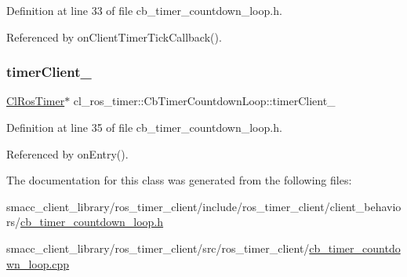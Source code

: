 Definition at line 33 of file cb\+\_\+timer\+\_\+countdown\+\_\+loop.\+h.



Referenced by on\+Client\+Timer\+Tick\+Callback().

\mbox{\label{classcl__ros__timer_1_1CbTimerCountdownLoop_acca81b8f1807f8e8faf692fb3f9e4dbd}} 
\subsubsection{\texorpdfstring{timer\+Client\+\_\+}{timerClient\_}}
{\footnotesize\ttfamily \hyperlink{classcl__ros__timer_1_1ClRosTimer}{Cl\+Ros\+Timer}$\ast$ cl\+\_\+ros\+\_\+timer\+::\+Cb\+Timer\+Countdown\+Loop\+::timer\+Client\+\_\+\hspace{0.3cm}{\ttfamily [private]}}



Definition at line 35 of file cb\+\_\+timer\+\_\+countdown\+\_\+loop.\+h.



Referenced by on\+Entry().



The documentation for this class was generated from the following files\+:\begin{DoxyCompactItemize}
\item 
smacc\+\_\+client\+\_\+library/ros\+\_\+timer\+\_\+client/include/ros\+\_\+timer\+\_\+client/client\+\_\+behaviors/\hyperlink{cb__timer__countdown__loop_8h}{cb\+\_\+timer\+\_\+countdown\+\_\+loop.\+h}\item 
smacc\+\_\+client\+\_\+library/ros\+\_\+timer\+\_\+client/src/ros\+\_\+timer\+\_\+client/\hyperlink{cb__timer__countdown__loop_8cpp}{cb\+\_\+timer\+\_\+countdown\+\_\+loop.\+cpp}\end{DoxyCompactItemize}
